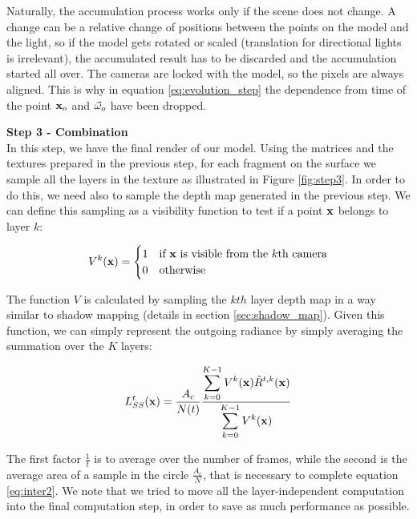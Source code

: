 Naturally, the accumulation process works only if the scene does not change. A change can be a relative change of positions between the points on the model and the light, so if the model gets rotated or scaled (translation for directional lights is irrelevant), the accumulated result has to be discarded and the accumulation started all over. The cameras are locked with the model, so the pixels are always aligned. This is why in equation \ref{eq:evolution_step} the dependence from time of the point $\mathbf{x}_o$ and $\vec{\omega}_o$ have been dropped. 
 
\textbf{Step 3 - Combination} \\
In this step, we have the final render of our model. Using the matrices and the textures prepared in the previous step, for each fragment on the surface we sample all the layers in the texture as illustrated in Figure \ref{fig:step3}. In order to do this, we need also to sample the depth map generated in the previous step. We can define this sampling as a visibility function to test if a point $\mathbf{x}$ belongs to layer $k$:

$$
V^k(\mathbf{x}) = \begin{cases}
1 & \text{if $\mathbf{x}$ is visible from the $k$th camera} \\
0 & \text{otherwise}
\end{cases}
$$

The function $V$ is calculated by sampling the $kth$ layer depth map in a way similar to shadow mapping (details in section \ref{sec:shadow_map}). Given this function, we can simply represent the outgoing radiance by simply averaging the summation over the $K$ layers:

$$
L_{SS}^t(\mathbf{x}) = \frac{A_c}{N (t)} \frac{\displaystyle\sum_{k = 0}^{K-1}V^k(\mathbf{x}) \tilde{R}^{t,k}(\mathbf{x})}{\displaystyle\sum_{k = 0}^{K-1}V^k(\mathbf{x})}
$$

The first factor $\frac{1}{t}$ is to average over the number of frames, while the second is the average area of a sample in the circle $\frac{A_c}{N}$, that is necessary to complete equation \ref{eq:inter2}. We note that we tried to move all the layer-independent computation into the final computation step, in order to save as much performance as possible. 

